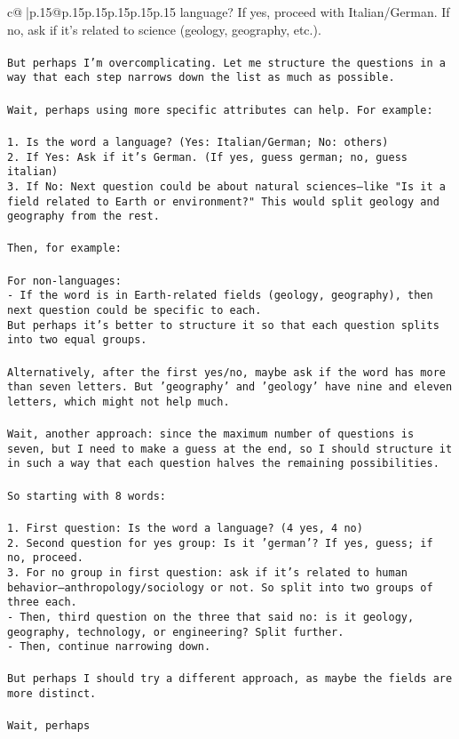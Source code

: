 \documentclass{article}
\begin{document}
{\begin{supertabular}{c@{$\;$}|p{.15\linewidth}@{}p{.15\linewidth}p{.15\linewidth}p{.15\linewidth}p{.15\linewidth}p{.15\linewidth}}
{{{language? If yes, proceed with Italian/German. If no, ask if it's related to science (geology, geography, etc.).\\ \tt \\ \tt But perhaps I'm overcomplicating. Let me structure the questions in a way that each step narrows down the list as much as possible.\\ \tt \\ \tt Wait, perhaps using more specific attributes can help. For example:\\ \tt \\ \tt 1. Is the word a language? (Yes: Italian/German; No: others)\\ \tt 2. If Yes: Ask if it's German. (If yes, guess german; no, guess italian)\\ \tt 3. If No: Next question could be about natural sciences—like "Is it a field related to Earth or environment?" This would split geology and geography from the rest.\\ \tt \\ \tt Then, for example:\\ \tt \\ \tt For non-languages:\\ \tt - If the word is in Earth-related fields (geology, geography), then next question could be specific to each.\\ \tt But perhaps it's better to structure it so that each question splits into two equal groups.\\ \tt \\ \tt Alternatively, after the first yes/no, maybe ask if the word has more than seven letters. But 'geography' and 'geology' have nine and eleven letters, which might not help much.\\ \tt \\ \tt Wait, another approach: since the maximum number of questions is seven, but I need to make a guess at the end, so I should structure it in such a way that each question halves the remaining possibilities.\\ \tt \\ \tt So starting with 8 words:\\ \tt \\ \tt 1. First question: Is the word a language? (4 yes, 4 no)\\ \tt 2. Second question for yes group: Is it 'german'? If yes, guess; if no, proceed.\\ \tt 3. For no group in first question: ask if it's related to human behavior—anthropology/sociology or not. So split into two groups of three each.\\ \tt    - Then, third question on the three that said no: is it geology, geography, technology, or engineering? Split further.\\ \tt    - Then, continue narrowing down.\\ \tt \\ \tt But perhaps I should try a different approach, as maybe the fields are more distinct.\\ \tt \\ \tt Wait, perhaps }}}
\end{supertabular}}
\end{document}
